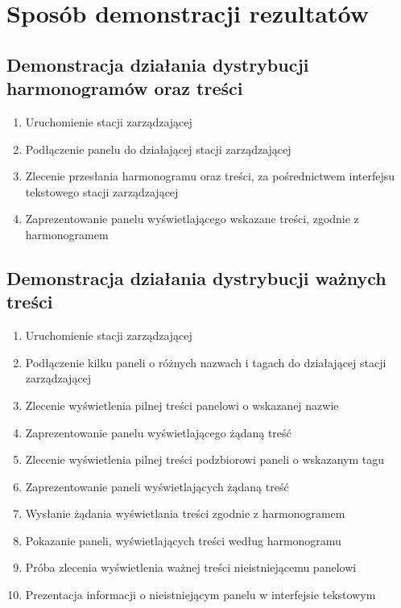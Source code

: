 \documentclass[12pt, a4paper]{article}
\providecommand{\tightlist}{%
  \setlength{\itemsep}{0pt}\setlength{\parskip}{0pt}}
\begin{document}
\hypertarget{sposuxf3b-demonstracji-rezultatuxf3w}{%
\section{Sposób demonstracji rezultatów}\label{sposuxf3b-demonstracji-rezultatuxf3w}}

\hypertarget{demonstracja-dziaux142ania-dystrybucji-harmonogramuxf3w-oraz-treux15bci}{%
\subsection{Demonstracja działania dystrybucji harmonogramów oraz treści}\label{demonstracja-dziaux142ania-dystrybucji-harmonogramuxf3w-oraz-treux15bci}}

\begin{enumerate}
\def\labelenumi{\arabic{enumi}.}
\tightlist
\item
  Uruchomienie stacji zarządzającej
\item
  Podłączenie panelu do działającej stacji zarządzającej
\item
  Zlecenie przesłania harmonogramu oraz treści, za pośrednictwem
  interfejsu tekstowego stacji zarządzającej
\item
  Zaprezentowanie panelu wyświetlającego wskazane treści, zgodnie z
  harmonogramem
\end{enumerate}

\hypertarget{demonstracja-dziaux142ania-dystrybucji-waux17cnych-treux15bci}{%
\subsection{Demonstracja działania dystrybucji ważnych treści}\label{demonstracja-dziaux142ania-dystrybucji-waux17cnych-treux15bci}}

\begin{enumerate}
\def\labelenumi{\arabic{enumi}.}
\tightlist
\item
  Uruchomienie stacji zarządzającej
\item
  Podłączenie kilku paneli o różnych nazwach i tagach do działającej
  stacji zarządzającej
\item
  Zlecenie wyświetlenia pilnej treści panelowi o wskazanej nazwie
\item
  Zaprezentowanie panelu wyświetlającego żądaną treść
\item
  Zlecenie wyświetlenia pilnej treści podzbiorowi paneli o wskazanym
  tagu
\item
  Zaprezentowanie paneli wyświetlających żądaną treść
\item
  Wysłanie żądania wyświetlania treści zgodnie z harmonogramem
\item
  Pokazanie paneli, wyświetlających treści według harmonogramu
\item
  Próba zlecenia wyświetlenia ważnej treści nieistniejącemu panelowi
\item
  Prezentacja informacji o nieistniejącym panelu w interfejsie tekstowym
\end{enumerate}
\end{document}
